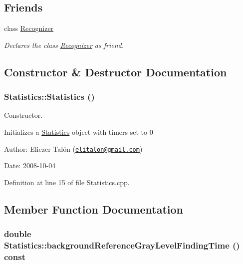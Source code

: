 \subsection*{Friends}
\begin{CompactItemize}
\item 
\hypertarget{class_statistics_11123fa51c07995419270030024a7dfe}{
class \hyperlink{class_statistics_11123fa51c07995419270030024a7dfe}{Recognizer}}
\label{class_statistics_11123fa51c07995419270030024a7dfe}

\begin{CompactList}\small\item\em Declares the class \hyperlink{class_recognizer}{Recognizer} as friend. \item\end{CompactList}\end{CompactItemize}


\subsection{Constructor \& Destructor Documentation}
\hypertarget{class_statistics_60ddd90a571ed4c3ce8c0f6317a36d63}{
\subsubsection[Statistics]{\setlength{\rightskip}{0pt plus 5cm}Statistics::Statistics ()}}
\label{class_statistics_60ddd90a571ed4c3ce8c0f6317a36d63}


Constructor. 

Initializes a \hyperlink{class_statistics}{Statistics} object with timers set to 0

\begin{Desc}
\item[Author:]Eliezer Talón (\href{mailto:elitalon@gmail.com}{\tt elitalon@gmail.com}) \end{Desc}
\begin{Desc}
\item[Date:]2008-10-04 \end{Desc}


Definition at line 15 of file Statistics.cpp.

\subsection{Member Function Documentation}
\hypertarget{class_statistics_565e90b1940d12bb2a2661f6dcea230d}{
\subsubsection[backgroundReferenceGrayLevelFindingTime]{\setlength{\rightskip}{0pt plus 5cm}double Statistics::backgroundReferenceGrayLevelFindingTime () const}}
\label{class_statistics_565e90b1940d12bb2a2661f6dcea230d}


